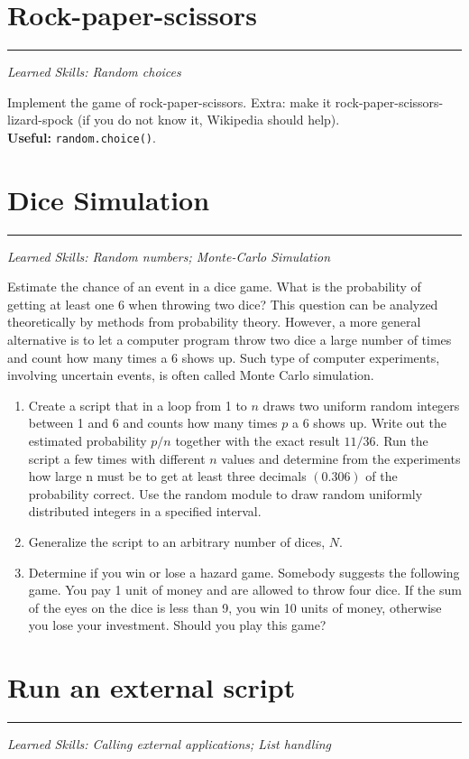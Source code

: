 \documentclass[smallheadings,12pt]{scrartcl}
\newcommand{\skills}[1]{\rule{1cm}{0pt}{\begin{minipage}{.8\textwidth}\small\em
      Learned Skills:  #1\end{minipage}}}
\begin{document}
\section{Rock-paper-scissors}
\skills{Random choices}

Implement the game of rock-paper-scissors.
Extra: make it {rock-paper-scissors-lizard-spock} (if you do not know it, Wikipedia should help).\\[2pt]
\textbf{Useful:} {\tt random.choice()}.

\section{Dice Simulation}
\skills{Random numbers; Monte-Carlo Simulation}

Estimate the chance of an event in a dice game.  What is the
probability of getting at least one 6 when throwing two dice?  This
question can be analyzed theoretically by methods from probability
theory. However, a more general alternative is to let a computer
program throw two dice a large number of times and count how many
times a 6 shows up. Such type of computer experiments, involving
uncertain events, is often called Monte Carlo simulation. 

\begin{enumerate}
\item Create a script that in a loop from 1 to $n$ draws two uniform
  random integers between 1 and 6 and counts how many times $p$ a 6
  shows up. Write out the estimated probability $p/n$ together with
  the exact result $11/36$.  Run the script a few times with different
  $n$ values and determine from the experiments how large n must be to
  get at least three decimals $(0.306)$ of the probability
  correct.  Use the random module to draw random uniformly distributed
  integers in a specified interval.
\item Generalize the script to an arbitrary number of dices, $N$.
\item Determine if you win or lose a hazard game.  Somebody suggests
  the following game. You pay 1 unit of money and are allowed to throw
  four dice. If the sum of the eyes on the dice is less than 9, you
  win 10 units of money, otherwise you lose your investment. Should
  you play this game?
\end{enumerate}


\section{Run an external script}
\skills{Calling external applications; List handling}
\end{document}
